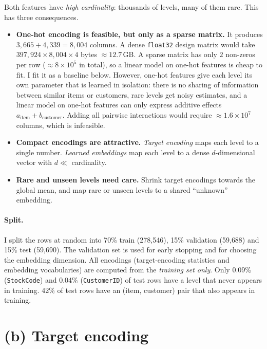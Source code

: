 \documentclass[11pt]{article}
\begin{document}
Both features have \emph{high cardinality}: thousands of levels, many of them rare. This has
three consequences.
\begin{itemize}
 \item \textbf{One-hot encoding is feasible, but only as a sparse matrix.} It produces
 $3{,}665+4{,}339=8{,}004$ columns. A dense \texttt{float32} design matrix would take
 $397{,}924\times 8{,}004\times4$ bytes $\approx 12.7$\,GB. A sparse matrix has only $2$
 non-zeros per row ($\approx8\times10^5$ in total), so a linear model on one-hot features is
 cheap to fit. I fit it as a baseline below. However, one-hot features give each level its own
 parameter that is learned in isolation: there is no sharing of information between similar
 items or customers, rare levels get noisy estimates, and a linear model on one-hot features can
 only express additive effects $a_{\text{item}}+b_{\text{customer}}$. Adding all pairwise
 interactions would require $\approx1.6\times10^7$ columns, which is infeasible.
 \item \textbf{Compact encodings are attractive.} \emph{Target encoding} maps each level to a
 single number. \emph{Learned embeddings} map each level to a dense $d$-dimensional vector with
 $d\ll$ cardinality.
 \item \textbf{Rare and unseen levels need care.} Shrink target encodings towards the global mean,
 and map rare or unseen levels to a shared ``unknown'' embedding.
\end{itemize}

\paragraph{Split.} I split the rows at random into 70\% train (278{,}546), 15\% validation
(59{,}688) and 15\% test (59{,}690). The validation set is used for early stopping and for choosing
the embedding dimension. All encodings (target-encoding statistics and embedding vocabularies) are
computed from the \emph{training set only}. Only 0.09\% (\texttt{StockCode}) and 0.04\%
(\texttt{CustomerID}) of test rows have a level that never appears in training. 42\% of test rows
have an (item, customer) pair that also appears in training.

\section*{(b) Target encoding}
\end{document}
